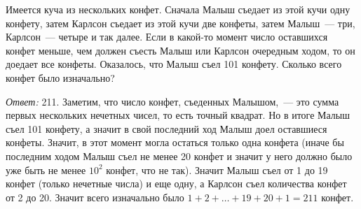 \problem
Имеется куча из нескольких конфет.
Сначала Малыш съедает из этой кучи одну конфету, затем Карлсон съедает из этой
кучи две конфеты, затем Малыш~--- три, Карлсон~--- четыре и так далее.
Если в какой-то момент число оставшихся конфет меньше, чем должен съесть Малыш
или Карлсон очередным ходом, то он доедает все конфеты.
Оказалось, что Малыш съел 101 конфету.
Сколько всего конфет было изначально?

\solution
\emph{Ответ:} 211.
Заметим, что число конфет, съеденных Малышом,~--- это сумма первых нескольких
нечетных чисел, то есть точный квадрат.
Но в итоге Малыш съел 101 конфету, а значит в свой последний ход Малыш доел
оставшиеся конфеты.
Значит, в этот момент могла остаться только одна конфета
(иначе бы последним ходом Малыш съел не менее 20 конфет и значит у него должно
было уже быть не менее $10^2$ конфет, что не так).
Значит Малыш съел от 1 до 19 конфет (только нечетные числа) и еще одну, а
Карлсон съел количества конфет от 2 до 20.
Значит всего изначально было $1 + 2 + \ldots + 19 + 20 + 1 = 211$ конфет.
\endproblem
